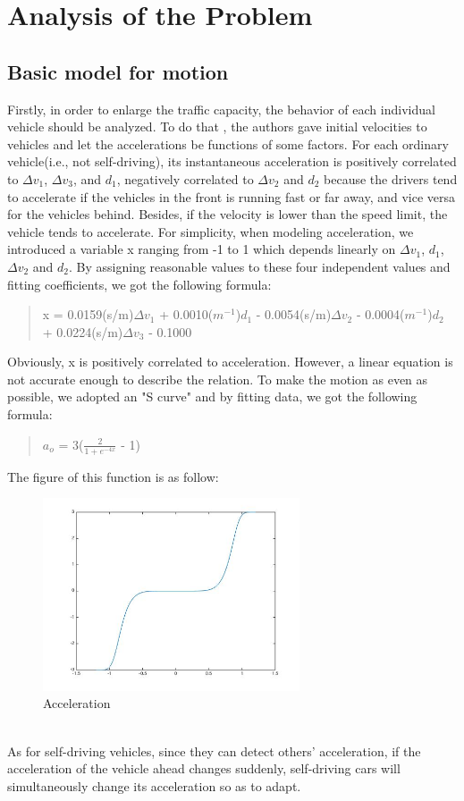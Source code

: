 \documentclass{icmmcm}
\begin{document}
\section{Analysis of the Problem}
\subsection{Basic model for motion}
Firstly, in order to enlarge the traffic capacity, the behavior of each individual vehicle should be analyzed. To do that , the authors gave  initial velocities to vehicles and let the accelerations be  functions of some factors. For each ordinary vehicle(i.e., not self-driving), its instantaneous acceleration is positively correlated to $\Delta$$v_{1}$, $\Delta$$v_{3}$, and $d_{1}$, negatively correlated to $\Delta$$v_{2}$ and $d_{2}$ because the drivers tend to accelerate if the vehicles in the front is running fast or far away, and vice versa for the vehicles behind. Besides, if the velocity is lower than the speed limit, the vehicle tends to accelerate. For simplicity, when modeling acceleration, we introduced a variable x ranging from -1 to 1 which depends linearly on  $\Delta$$v_{1}$,  $d_{1}$, $\Delta$$v_{2}$ and $d_{2}$. By assigning reasonable values to these four independent values and fitting coefficients, we got the following formula:
\begin{quotation}
 x = 0.0159(s/m)$\Delta$$v_{1}$ + 0.0010($m^{-1}$)$d_{1}$ - 0.0054(s/m)$\Delta$$v_{2}$ - 0.0004($m^{-1}$)$d_{2}$ + 0.0224(s/m)$\Delta$$v_{3}$ - 0.1000
\end{quotation}
Obviously, x is positively correlated to acceleration. However, a linear equation is not accurate enough to describe the relation. To make the motion as even as possible, we adopted an "S curve" and by fitting data, we got the following formula:\\
\begin{quotation}
$a_{o}$ = 3($\frac{2}{1 + e^{-4x}}$ - 1) %
\end{quotation}
The figure of this function is as follow:\\
\begin{figure}[!htp]
\centering
\includegraphics[height=5.7cm]{Acceleration.jpg}
\caption{Acceleration}
\end{figure}
\\
As for self-driving vehicles, since they can detect others' acceleration, if the acceleration of the vehicle ahead changes suddenly, self-driving cars will simultaneously change its acceleration so as to adapt.\\
\end{document}

